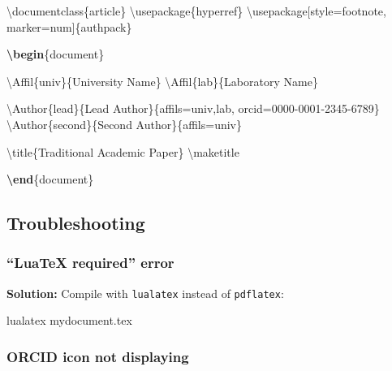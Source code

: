 \documentclass[
]{article}
\newenvironment{Shaded}{}{}
\newcommand{\BuiltInTok}[1]{#1}
\newcommand{\ExtensionTok}[1]{#1}
\newcommand{\FunctionTok}[1]{\textcolor[rgb]{0.02,0.16,0.49}{#1}}
\newcommand{\KeywordTok}[1]{\textcolor[rgb]{0.00,0.44,0.13}{\textbf{#1}}}
\newcommand{\NormalTok}[1]{#1}
\begin{document}
\begin{Shaded}
\begin{Highlighting}[]
\BuiltInTok{\textbackslash{}documentclass}\NormalTok{\{}\ExtensionTok{article}\NormalTok{\}}
\BuiltInTok{\textbackslash{}usepackage}\NormalTok{\{}\ExtensionTok{hyperref}\NormalTok{\}}
\BuiltInTok{\textbackslash{}usepackage}\NormalTok{[style=footnote, marker=num]\{}\ExtensionTok{authpack}\NormalTok{\}}

\KeywordTok{\textbackslash{}begin}\NormalTok{\{}\ExtensionTok{document}\NormalTok{\}}

\FunctionTok{\textbackslash{}Affil}\NormalTok{\{univ\}\{University Name\}}
\FunctionTok{\textbackslash{}Affil}\NormalTok{\{lab\}\{Laboratory Name\}}

\FunctionTok{\textbackslash{}Author}\NormalTok{\{lead\}\{Lead Author\}\{affils=univ,lab, orcid=0000{-}0001{-}2345{-}6789\}}
\FunctionTok{\textbackslash{}Author}\NormalTok{\{second\}\{Second Author\}\{affils=univ\}}

\FunctionTok{\textbackslash{}title}\NormalTok{\{Traditional Academic Paper\}}
\FunctionTok{\textbackslash{}maketitle}

\KeywordTok{\textbackslash{}end}\NormalTok{\{}\ExtensionTok{document}\NormalTok{\}}
\end{Highlighting}
\end{Shaded}

\hypertarget{troubleshooting}{%
\subsection{Troubleshooting}\label{troubleshooting}}

\hypertarget{luatex-required-error}{%
\subsubsection{``LuaTeX required'' error}\label{luatex-required-error}}

\textbf{Solution:} Compile with \texttt{lualatex} instead of
\texttt{pdflatex}:

\begin{Shaded}
\begin{Highlighting}[]
\ExtensionTok{lualatex}\NormalTok{ mydocument.tex}
\end{Highlighting}
\end{Shaded}

\hypertarget{orcid-icon-not-displaying}{%
\subsubsection{ORCID icon not
displaying}\label{orcid-icon-not-displaying}}
\end{document}
